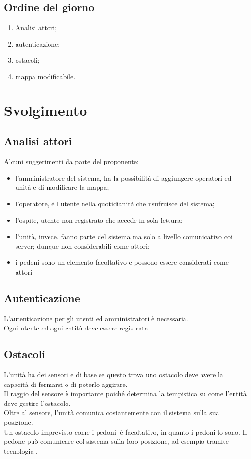 \documentclass[]{article}
\begin{document}
		\subsection{Ordine del giorno}
		\begin{enumerate}
			\item Analisi attori;
			\item autenticazione;
			\item ostacoli;
			\item mappa modificabile.
		\end{enumerate}
\newpage
	\section{Svolgimento}
		\subsection{Analisi attori}
		Alcuni suggerimenti da parte del proponente:
		\begin{itemize}
			\item l'amministratore del sistema, ha la possibilità di aggiungere operatori ed unità e di modificare la mappa;
			\item l'operatore, è l'utente nella quotidianità che usufruisce del sistema;
			\item l'ospite, utente non registrato che accede in sola lettura;
			\item l'unità, invece, fanno parte del sistema ma solo a livello comunicativo coi server; dunque non considerabili come attori;
			\item i pedoni sono un elemento facoltativo e possono essere considerati come attori.
		\end{itemize}


		\subsection{Autenticazione}
		L'autenticazione per gli utenti ed amministratori è necessaria. \\
		Ogni utente ed ogni entità deve essere registrata.

		\subsection{Ostacoli}
		L'unità ha dei sensori e di base se questo trova uno ostacolo deve avere la capacità di fermarsi o di poterlo aggirare. \\
		Il raggio del sensore è importante poiché determina la tempistica su come l'entità deve gestire l'ostacolo.\\
		Oltre al sensore, l'unità comunica costantemente con il sistema sulla sua posizione. \\
		Un ostacolo imprevisto come i pedoni, è facoltativo, in quanto i pedoni lo sono.
		Il pedone può comunicare col sistema sulla loro posizione, ad esempio tramite tecnologia .
\end{document}
